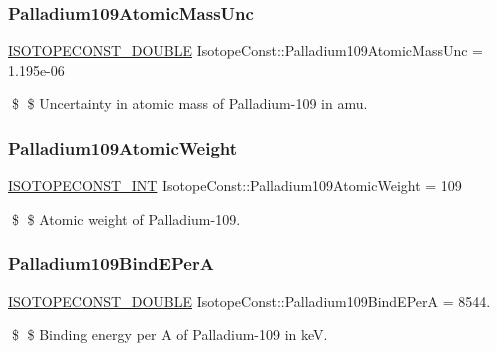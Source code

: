 \subsubsection{\texorpdfstring{Palladium109\+Atomic\+Mass\+Unc}{Palladium109AtomicMassUnc}}
{\footnotesize\ttfamily \mbox{\hyperlink{group___isotope_const-_macros_ga8f45a7272ce02c0b4c65c44636ed719a}{I\+S\+O\+T\+O\+P\+E\+C\+O\+N\+S\+T\+\_\+\+D\+O\+U\+B\+LE}} Isotope\+Const\+::\+Palladium109\+Atomic\+Mass\+Unc = 1.\+195e-\/06}

\$ \$ Uncertainty in atomic mass of Palladium-\/109 in amu. \mbox{\label{group___isotope_const-_palladium-_pd109_gaf32892da5b3009e0ff81947918723508}} 
\subsubsection{\texorpdfstring{Palladium109\+Atomic\+Weight}{Palladium109AtomicWeight}}
{\footnotesize\ttfamily \mbox{\hyperlink{group___isotope_const-_macros_ga5f18360b3e99483a35c32d789e62621c}{I\+S\+O\+T\+O\+P\+E\+C\+O\+N\+S\+T\+\_\+\+I\+NT}} Isotope\+Const\+::\+Palladium109\+Atomic\+Weight = 109}

\$ \$ Atomic weight of Palladium-\/109. \mbox{\label{group___isotope_const-_palladium-_pd109_ga79092d0ce8a660b476b8d1d815e99e42}} 
\subsubsection{\texorpdfstring{Palladium109\+Bind\+E\+PerA}{Palladium109BindEPerA}}
{\footnotesize\ttfamily \mbox{\hyperlink{group___isotope_const-_macros_ga8f45a7272ce02c0b4c65c44636ed719a}{I\+S\+O\+T\+O\+P\+E\+C\+O\+N\+S\+T\+\_\+\+D\+O\+U\+B\+LE}} Isotope\+Const\+::\+Palladium109\+Bind\+E\+PerA = 8544.}

\$ \$ Binding energy per A of Palladium-\/109 in keV. \mbox{\label{group___isotope_const-_palladium-_pd109_ga46f9d7288fa1e29f067890051a99eaa0}} 
